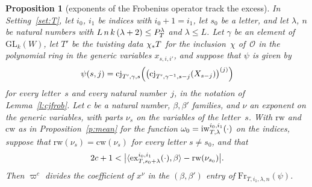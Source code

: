 \documentclass[11pt,a4paper]{article}
\newcommand{\m}[1]{\mbox{$#1$}}        %
\theoremstyle{plainx}
\newtheorem{proposition}[theorem]{Proposition}
\theoremstyle{uprightx}
\newcommand{\cO}{\mathcal{O}}
\newcommand{\GLk}{\mathrm{GL}_{k}}
\newcommand{\pr}[2]{\langle#1,#2\rangle}
\newcommand{\frob}[5]{\mathrm{Fr}_{#1,#2,#3,#4}(#5)}
\begin{document}
\begin{proposition}[exponents of the Frobenius operator track the excess]\label{p:powdvd}
In Setting~\ref{set:T}, let \m{i_0}, \m{i_1} be indices with \m{i_0+1=i_1}, let $s_0$ be a letter, and let
$\lambda$, $n$ be natural numbers with \m{L\,n\,k\,(\lambda+2)\le\PT{T}^{\lambda}} and \m{\lambda\le L}. Let
$\gamma$ be an element of \m{\GLk(W)}, let \m{T'} be the twisting data \m{\Tmap{\chi}{T}} for the inclusion~$\chi$
of~$\cO$ in the polynomial ring in the generic variables \m{x_{s,i,i'}}, and suppose that $\psi$ is given by
\[\psi(s,j)=\mathrm{cj}_{T',\gamma,s}\Bigl(\bigl(\mathrm{cj}_{T',\gamma^{-1},s-j}(X_{s-j})\bigr)^{(j)}\Bigr)\]
for every letter~$s$ and every natural number~$j$, in the notation of Lemma~\ref{l:cjfrob}. Let $c$ be a natural
number, \m{\beta,\beta'} families, and $\nu$ an exponent on the generic variables, with parts \m{\nu_s} on the
variables of the letter~$s$. With \m{\mathrm{rw}} and \m{\mathrm{cw}} as in Proposition~\ref{p:mean} for the function
\m{\omega_0=\idxw{T}{\lambda}{i_0}{i_1}{\cdot}} on the indices, suppose that
\m{\mathrm{rw}(\nu_s)=\mathrm{cw}(\nu_s)} for every letter \m{s\ne s_0}, and that
\[2c+1<\bigl|\pr{\exw{T}{s_0+\lambda}{i_0}{i_1}{\cdot}}{\beta}-\mathrm{rw}(\nu_{s_0})\bigr| .\]
Then \m{\varpi^{c}} divides the coefficient of \m{x^{\nu}} in the \m{(\beta,\beta')} entry of
\m{\frob{T}{i_1}{\lambda}{n}{\psi}}.
\end{proposition}
\end{document}
